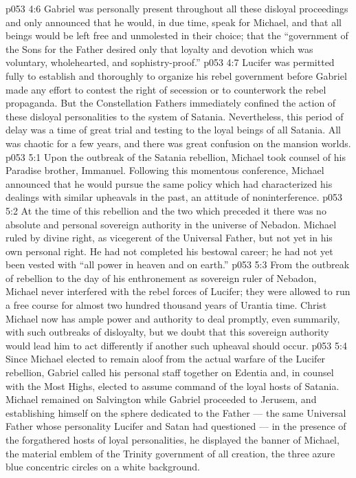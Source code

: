 \vs p053 4:6 Gabriel was personally present throughout all these disloyal proceedings and only announced that he would, in due time, speak for Michael, and that all beings would be left free and unmolested in their choice; that the “government of the Sons for the Father desired only that loyalty and devotion which was voluntary, wholehearted, and sophistry\hyp{}proof.”
\vs p053 4:7 \pc Lucifer was permitted fully to establish and thoroughly to organize his rebel government before Gabriel made any effort to contest the right of secession or to counterwork the rebel propaganda. But the Constellation Fathers immediately confined the action of these disloyal personalities to the system of Satania. Nevertheless, this period of delay was a time of great trial and testing to the loyal beings of all Satania. All was chaotic for a few years, and there was great confusion on the mansion worlds.
\vs p053 5:1 Upon the outbreak of the Satania rebellion, Michael took counsel of his Paradise brother, Immanuel. Following this momentous conference, Michael announced that he would pursue the same policy which had characterized his dealings with similar upheavals in the past, an attitude of noninterference.
\vs p053 5:2 \pc At the time of this rebellion and the two which preceded it there was no absolute and personal sovereign authority in the universe of Nebadon. Michael ruled by divine right, as vicegerent of the Universal Father, but not yet in his own personal right. He had not completed his bestowal career; he had not yet been vested with “all power in heaven and on earth.”
\vs p053 5:3 From the outbreak of rebellion to the day of his enthronement as sovereign ruler of Nebadon, Michael never interfered with the rebel forces of Lucifer; they were allowed to run a free course for almost two hundred thousand years of Urantia time. Christ Michael now has ample power and authority to deal promptly, even summarily, with such outbreaks of disloyalty, but we doubt that this sovereign authority would lead him to act differently if another such upheaval should occur.
\vs p053 5:4 \pc Since Michael elected to remain aloof from the actual warfare of the Lucifer rebellion, Gabriel called his personal staff together on Edentia and, in counsel with the Most Highs, elected to assume command of the loyal hosts of Satania. Michael remained on Salvington while Gabriel proceeded to Jerusem, and establishing himself on the sphere dedicated to the Father --- the same Universal Father whose personality Lucifer and Satan had questioned --- in the presence of the forgathered hosts of loyal personalities, he displayed the banner of Michael, the material emblem of the Trinity government of all creation, the three azure blue concentric circles on a white background.
